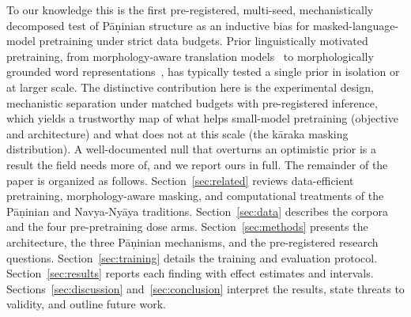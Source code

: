 To our knowledge this is the first pre-registered, multi-seed, mechanistically decomposed test of Pāṇinian structure as an inductive bias for masked-language-model pretraining under strict data budgets. Prior linguistically motivated pretraining, from morphology-aware translation models~\cite{Belinkov2017Morphology} to morphologically grounded word representations~\cite{Botha2014Morphology}, has typically tested a single prior in isolation or at larger scale. The distinctive contribution here is the experimental design, mechanistic separation under matched budgets with pre-registered inference, which yields a trustworthy map of what helps small-model pretraining (objective and architecture) and what does not at this scale (the kāraka masking distribution). A well-documented null that overturns an optimistic prior is a result the field needs more of, and we report ours in full. The remainder of the paper is organized as follows. Section~\ref{sec:related} reviews data-efficient pretraining, morphology-aware masking, and computational treatments of the Pāṇinian and Navya-Nyāya traditions. Section~\ref{sec:data} describes the corpora and the four pre-pretraining dose arms. Section~\ref{sec:methods} presents the architecture, the three Pāṇinian mechanisms, and the pre-registered research questions. Section~\ref{sec:training} details the training and evaluation protocol. Section~\ref{sec:results} reports each finding with effect estimates and intervals. Sections~\ref{sec:discussion} and~\ref{sec:conclusion} interpret the results, state threats to validity, and outline future work.
